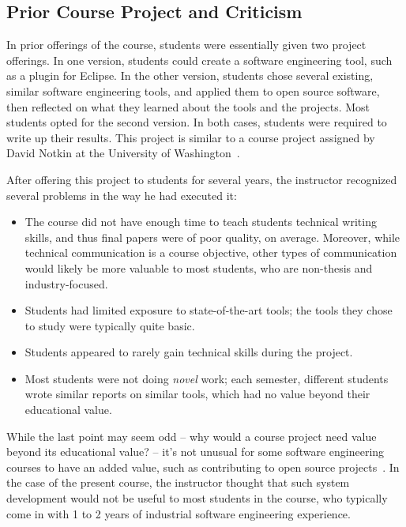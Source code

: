 \documentclass[10pt,conference]{IEEEtran}
\begin{document}
\subsection{Prior Course Project and Criticism}\label{sec:priorProj}

In prior offerings of the course,
students were essentially given two project offerings.
In one version, students could create
a software engineering tool, such as a plugin for Eclipse.
In the other version, students chose several existing,
similar software engineering tools, and applied them
to open source software, then reflected 
on what they learned about the tools and the 
projects.
Most students opted for the second version.
In both cases, students were required to write up their results.
This project is similar to a course project
assigned by David Notkin at the 
University of Washington~\cite{gradSEUW}.

After offering this project to students for 
several years, the instructor recognized several
problems in the way he had executed it:

\begin{itemize}  
  \item The course did not have enough time to teach students
  		technical writing skills, and thus final papers were 
  		of poor quality, on average. Moreover, while technical
  		communication is a course objective, other types of
  		communication would likely be more valuable to most
  		students, who are non-thesis and industry-focused.   		 
  \item Students had limited exposure to state-of-the-art
  		tools; the tools they chose to study were typically
  		quite basic.
  \item Students appeared to rarely gain technical skills 
  		during the project.  
  \item Most students were not doing \emph{novel} work; each semester,
  		different students wrote similar reports on similar tools,
  		which had no value beyond their educational value. 
\end{itemize}

While the last point may seem odd -- why would a course project need
value beyond its educational value? -- it's not unusual for 
some software engineering courses to have an added value,
such as contributing to open source projects~\cite{pedroni2007open,meneely2008rose}.
In the case of the present course, the instructor thought 
that such system development would not be useful to most students
in the course, who typically come in with 1 to 2 years of 
industrial software engineering experience. 
\end{document}
